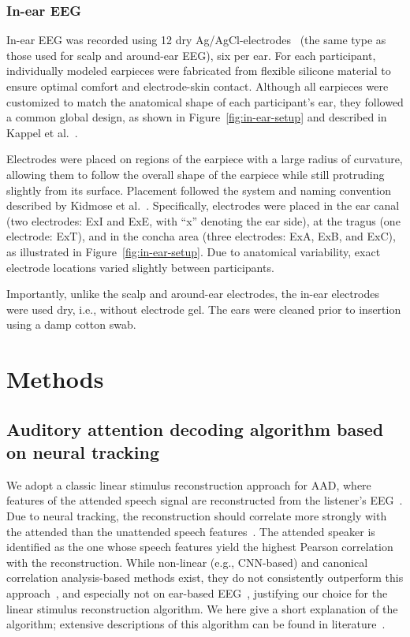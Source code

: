 \documentclass[fleqn,10pt]{wlscirep}
\begin{document}
	\subsubsection*{In-ear EEG}
	In-ear EEG was recorded using 12 dry Ag/AgCl-electrodes~\cite{kappel2022characterization} (the same type as those used for scalp and around-ear EEG), six per ear. For each participant, individually modeled earpieces were fabricated from flexible silicone material to ensure optimal comfort and electrode-skin contact. Although all earpieces were customized to match the anatomical shape of each participant's ear, they followed a common global design, as shown in Figure~\ref{fig:in-ear-setup} and described in Kappel et al.~\cite{kappel2019dry}. 
	
	Electrodes were placed on regions of the earpiece with a large radius of curvature, allowing them to follow the overall shape of the earpiece while still protruding slightly from its surface. Placement followed the system and naming convention described by Kidmose et al.~\cite{kidmose2013study}. Specifically, electrodes were placed in the ear canal (two electrodes: ExI and ExE, with “x” denoting the ear side), at the tragus (one electrode: ExT), and in the concha area (three electrodes: ExA, ExB, and ExC), as illustrated in Figure~\ref{fig:in-ear-setup}. Due to anatomical variability, exact electrode locations varied slightly between participants.
	
	Importantly, unlike the scalp and around-ear electrodes, the in-ear electrodes were used dry, i.e., without electrode gel. The ears were cleaned prior to insertion using a damp cotton swab.
	
	\section*{Methods}
	
	\subsection*{Auditory attention decoding algorithm based on neural tracking}
	
	We adopt a classic linear stimulus reconstruction approach for AAD, where features of the attended speech signal are reconstructed from the listener’s EEG~\cite{osullivan2014attentional,geirnaert2021eegBased}. Due to neural tracking, the reconstruction should correlate more strongly with the attended than the unattended speech features~\cite{mesgarani2012selective,ding2012emergence}. The attended speaker is identified as the one whose speech features yield the highest Pearson correlation with the reconstruction. While non-linear (e.g., CNN-based) and canonical correlation analysis-based methods exist, they do not consistently outperform this approach~\cite{geirnaert2021eegBased}, and especially not on ear-based EEG~\cite{thornton2024comparison}, justifying our choice for the linear stimulus reconstruction algorithm. We here give a short explanation of the algorithm; extensive descriptions of this algorithm can be found in literature~\cite{osullivan2014attentional,geirnaert2021eegBased,geirnaert2022timeAdaptive}.
	
\end{document}
